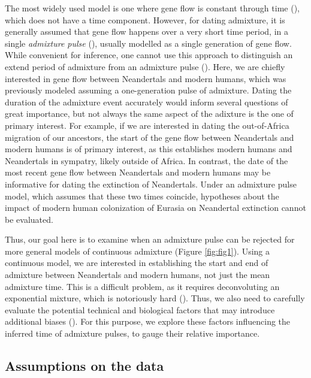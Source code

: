 \documentclass[]{article}
\begin{document}
The most widely used model is one where gene flow is constant through time (\cite{nielsen_distinguishing_2001,hey_multilocus_2004}), which does not have a time component. However, for dating admixture, it is generally assumed that gene flow
happens over a very short time period, in a single \textit{admixture pulse} (\cite{moorjani_history_2011}), usually modelled as a single generation
of gene flow. While convenient for inference, one cannot use this approach to distinguish an extend period of admixture from an admixture pulse (\cite{pickrell_toward_2014}). 
Here, we are chiefly interested in gene flow between Neandertals and modern humans, which was previously modeled assuming a one-generation pulse of admixture. Dating the duration of the admixture event accurately would inform several questions of  great importance, but not always the same aspect of the adixture is the one of primary interest. For example, if we are interested in dating the out-of-Africa migration of our ancestors, the start of the gene flow between Neandertals and modern humans is of primary interest, as this establishes modern humans and Neandertals in sympatry, likely outside of Africa.
In contrast, the date of the most recent gene flow between Neandertals and modern humans may be informative for dating the extinction of Neandertals. Under an admixture pulse model, which assumes that these two times coincide, hypotheses about the impact of modern human colonization of Eurasia on Neandertal extinction cannot be evaluated.

Thus, our goal here is to examine when an admixture pulse can be rejected for more general models of continuous admixture (Figure \ref{fig:fig1}).  Using a continuous model, we are interested in establishing the start and end of admixture between Neandertals and modern humans, not just the mean admixture time. This is a difficult problem, as it requires deconvoluting an exponential mixture, which is notoriously hard (\cite{dasgupta_mixture_2008}). Thus, we also need to carefully evaluate the potential technical and biological factors that may introduce additional biases (\cite{pool_inference_2009,gravel_population_2012,liang_lengths_2014}).
For this purpose, we explore these factors influencing the inferred time of admixture pulses, to gauge their relative importance.



\subsection{Assumptions on the data}\label{assumptions-on-the-data}
\end{document}
